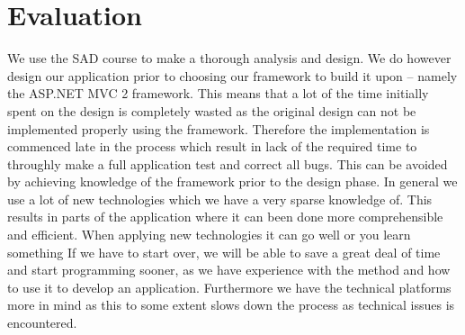 \chapter{Evaluation}
\label{chap:discussion}
We use the SAD course to make a thorough analysis and design.
We do however design our application prior to choosing our framework to build it upon -- namely the ASP.NET MVC 2 framework.
This means that a lot of the time initially spent on the design is completely wasted as the original design can not be implemented properly using the framework.
Therefore the implementation is commenced late in the process which result in lack of the required time to throughly make a full application test and correct all bugs.
This can be avoided by achieving knowledge of the framework prior to the design phase. 
In general we use a lot of new technologies which we have a very sparse knowledge of. This results in parts of the application where it can been done more comprehensible and efficient.
When applying new technologies it can go well or you learn something 
If we have to start over, we will be able to save a great deal of time and start programming sooner, as we have experience with the \ooad{} method and how to use it to develop an application. Furthermore we have the technical platforms more in mind as this to some extent slows down the process as technical issues is encountered.

